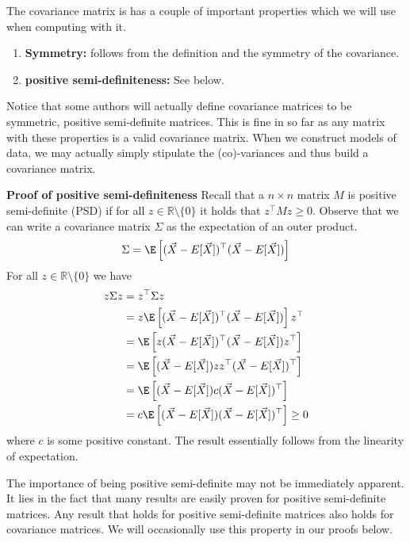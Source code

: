 The covariance matrix is has a couple of important properties which we will use when computing with it.
\begin{enumerate}
\item \textbf{Symmetry:} follows from the definition and the symmetry of the covariance.
\item \textbf{positive semi-definiteness:} See below.
\end{enumerate}
Notice that some authors will actually define covariance matrices to be symmetric, positive semi-definite matrices. This is fine in so far as any matrix with
these properties is a valid covariance matrix. When we construct models of data, we may actually simply stipulate the (co)-variances and thus build a covariance matrix.

\textbf{Proof of positive semi-definiteness} Recall that a $ n \times n $ matrix $ M $ is positive semi-definite (PSD) 
if for all $ z \in \mathbb{R}\setminus \{0\} $ it holds
that $ z^{\top}Mz \geq 0 $. Observe that we can write a covariance matrix $ \Sigma $ as the expectation of an outer product. 
\begin{equation}
\Sigma = \E\left[(\vec{X} - E[\vec{X}])^{\top}(\vec{X} - E[\vec{X}])\right]
\end{equation}
For all $ z \in 
\mathbb{R}\setminus \{0\} $ we have
\begin{align}
z\Sigma z &= z^{\top}\Sigma z \\
&= z \E\left[(\vec{X} - E[\vec{X}])^{\top}(\vec{X} - E[\vec{X}])\right] z^{\top} \\
&=  \E\left[ z (\vec{X} - E[\vec{X}])^{\top}(\vec{X} - E[\vec{X}]) z^{\top} \right] \\
&= \E\left[(\vec{X} - E[\vec{X}])zz^{\top} (\vec{X} - E[\vec{X}])^{\top} \right] \\
&= \E\left[(\vec{X} - E[\vec{X}])c (\vec{X} - E[\vec{X}])^{\top} \right] \\
&= c \E\left[(\vec{X} - E[\vec{X}]) (\vec{X} - E[\vec{X}])^{\top} \right] \geq 0
\end{align}
where $ c $ is some positive constant. The result essentially follows from the linearity of expectation. 

The importance of being positive semi-definite may not be immediately apparent. It lies in the fact that many results are easily proven for positive semi-definite 
matrices. Any result that holds for positive semi-definite matrices also holds for covariance matrices. We will occasionally use this property in our proofs below.

